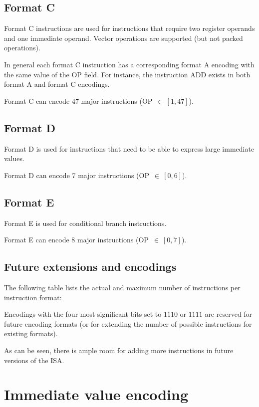 \subsection{Format C}

Format C instructions are used for instructions that require two register
operands and one immediate operand. Vector operations are supported (but not
packed operations).

In general each format C instruction has a corresponding format A encoding with
the same value of the OP field. For instance, the instruction ADD exists in
both format A and format C encodings.

Format C can encode 47 major instructions (OP~$\in~[1,47]$).

\subsection{Format D}

Format D is used for instructions that need to be able to express large
immediate values.

Format D can encode 7 major instructions (OP~$\in~[0,6]$).

\subsection{Format E}

Format E is used for conditional branch instructions.

Format E can encode 8 major instructions (OP~$\in~[0,7]$).

\subsection{Future extensions and encodings}

The following table lists the actual and maximum number of instructions per
instruction format:



Encodings with the four most significant bits set to $1110$ or $1111$ are
reserved for future encoding formats (or for extending the number of possible
instructions for existing formats).

As can be seen, there is ample room for adding more instructions in future
versions of the ISA.

\section{Immediate value encoding}

